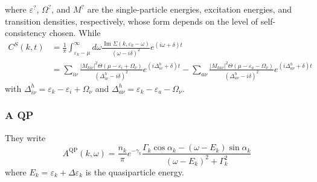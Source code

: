  where $\varepsilon^?$, $\Omega ^?$, and $M^?$ are the single-particle energies, excitation energies, and transition densities, respectively, whose form depends on the level of self-consistency chosen.
While
\begin{align}
C^S(k, t) & =\frac{1}{\pi} \int_{\varepsilon_k-\mu}^{\infty} d \omega \frac{\operatorname{Im} \Sigma\left(k, \varepsilon_k-\omega\right)}{(\omega-i \delta)^2} e^{(i \omega+\delta) t} \\
& =\sum_{i \nu} \frac{\left|M_{k i \nu}\right|^2 \Theta\left(\mu-\varepsilon_i+\Omega_\nu\right)}{\left(\Delta_{i \nu}^h-i \delta\right)^2} e^{\left(i \Delta_{i \nu}^h+\delta\right) t}-\sum_{a \nu} \frac{\left|M_{k a \nu}\right|^2 \Theta\left(\mu-\varepsilon_a-\Omega_\nu\right)}{\left(\Delta_{a \nu}^h-i \delta\right)^2} e^{\left(i \Delta_{a \nu}^h+\delta\right) t}
\end{align}
with
$\Delta_{i \nu}^h=\varepsilon_k-\varepsilon_i+\Omega_\nu$
and $\Delta_{a \nu}^h=\varepsilon_k-\varepsilon_a-\Omega_\nu$.
\subsubsection{A QP}
They write
\begin{equation}
    A^{\mathrm{QP}}(k, \omega)=\frac{n_k}{\pi} e^{-\gamma_k} \frac{\Gamma_k \cos \alpha_k-\left(\omega-E_k\right) \sin \alpha_k}{\left(\omega-E_k\right)^2+\Gamma_k^2}
\end{equation}
where $E_k=\varepsilon_k+\Delta \varepsilon_k$ is the quasiparticle energy. 
